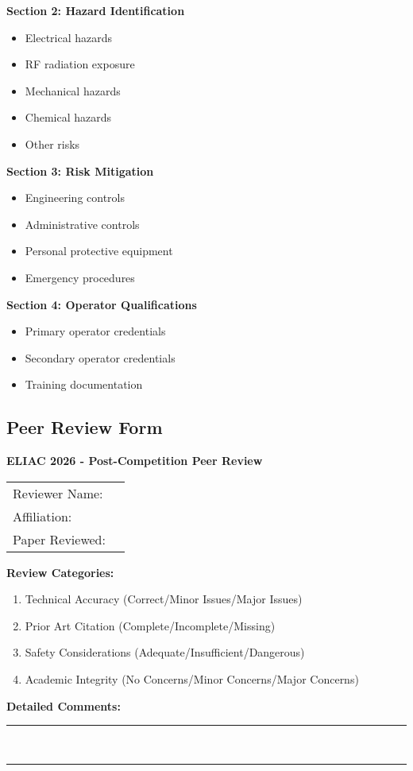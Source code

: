 \noindent\textbf{Section 2: Hazard Identification}
\begin{itemize}[noitemsep]
    \item Electrical hazards
    \item RF radiation exposure
    \item Mechanical hazards
    \item Chemical hazards
    \item Other risks
\end{itemize}

\noindent\textbf{Section 3: Risk Mitigation}
\begin{itemize}[noitemsep]
    \item Engineering controls
    \item Administrative controls
    \item Personal protective equipment
    \item Emergency procedures
\end{itemize}

\noindent\textbf{Section 4: Operator Qualifications}
\begin{itemize}[noitemsep]
    \item Primary operator credentials
    \item Secondary operator credentials
    \item Training documentation
\end{itemize}

\subsection{Peer Review Form}

\noindent\textbf{ELIAC 2026 - Post-Competition Peer Review}

\vspace{1em}
\begin{tabular}{ll}
Reviewer Name: & \underline{\hspace{8cm}} \\[0.5em]
Affiliation: & \underline{\hspace{8cm}} \\[0.5em]
Paper Reviewed: & \underline{\hspace{8cm}} \\[0.5em]
\end{tabular}

\vspace{1em}
\noindent\textbf{Review Categories:}
\begin{enumerate}[noitemsep]
    \item Technical Accuracy (Correct/Minor Issues/Major Issues)
    \item Prior Art Citation (Complete/Incomplete/Missing)
    \item Safety Considerations (Adequate/Insufficient/Dangerous)
    \item Academic Integrity (No Concerns/Minor Concerns/Major Concerns)
\end{enumerate}

\noindent\textbf{Detailed Comments:}\\
\noindent\rule{\textwidth}{0.5pt}\\
\noindent\rule{\textwidth}{0.5pt}
